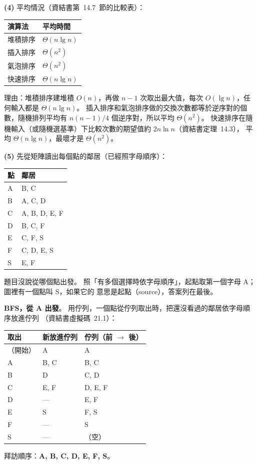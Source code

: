 \begin{pastsoln}
\textbf{(4)} 平均情況（資結書第~14.7~節的比較表）：
\begin{center}
\begin{tabular}{ll}
\toprule
演算法 & 平均時間 \\
\midrule
堆積排序 & $\Theta(n \lg n)$ \\
插入排序 & $\Theta(n^2)$ \\
氣泡排序 & $\Theta(n^2)$ \\
快速排序 & $\Theta(n \lg n)$ \\
\bottomrule
\end{tabular}
\end{center}
理由：堆積排序建堆積 $O(n)$，再做 $n - 1$ 次取出最大值，每次 $O(\lg n)$，任何輸入都是 $\Theta(n \lg n)$。
插入排序和氣泡排序做的交換次數都等於逆序對的個數，隨機排列平均有 $n(n-1)/4$ 個逆序對，所以平均
$\Theta(n^2)$。 快速排序在隨機輸入（或隨機選基準）下比較次數的期望值約 $2n \ln n$（資結書定理~14.3），
平均 $\Theta(n \lg n)$，最壞才是 $\Theta(n^2)$。

\textbf{(5)} 先從矩陣讀出每個點的鄰居（已經照字母順序）：
\begin{center}
\begin{tabular}{ll}
\toprule
點 & 鄰居 \\
\midrule
A & B, C \\
B & A, C, D \\
C & A, B, D, E, F \\
D & B, C, F \\
E & C, F, S \\
F & C, D, E, S \\
S & E, F \\
\bottomrule
\end{tabular}
\end{center}
題目沒說從哪個點出發。 照「有多個選擇時依字母順序」，起點取第一個字母 A；圖裡有一個點叫 S，如果它的
意思是起點（source），答案列在最後。

\textbf{BFS，從 A 出發}。 用佇列，一個點從佇列取出時，把還沒看過的鄰居依字母順序放進佇列
（資結書虛擬碼~21.1）：
\begin{center}
\begin{tabular}{lll}
\toprule
取出 & 新放進佇列 & 佇列（前 $\to$ 後） \\
\midrule
（開始） & A & A \\
A & B, C & B, C \\
B & D & C, D \\
C & E, F & D, E, F \\
D & --- & E, F \\
E & S & F, S \\
F & --- & S \\
S & --- & （空） \\
\bottomrule
\end{tabular}
\end{center}
拜訪順序：\textbf{A, B, C, D, E, F, S}。


\end{pastsoln}
